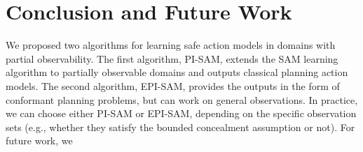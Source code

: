 \documentclass[letterpaper]{article} %
\newcommand{\pre}{\textit{pre}}
\newcommand{\eff}{\textit{eff}}
\begin{document}



\section{Conclusion and Future Work}
We proposed two algorithms for learning safe action models in domains with partial observability. The first algorithm, PI-SAM, extends the SAM learning algorithm \citep{juba2021safe} to partially observable domains and outputs classical planning action models. The second algorithm, EPI-SAM, provides the outputs in the form of conformant planning problems, but can work on general observations. In practice,  we can choose either PI-SAM or EPI-SAM, depending on the specific observation sets (e.g., whether they satisfy the bounded concealment assumption or not). For future work, we 



\clearpage

\end{document}

